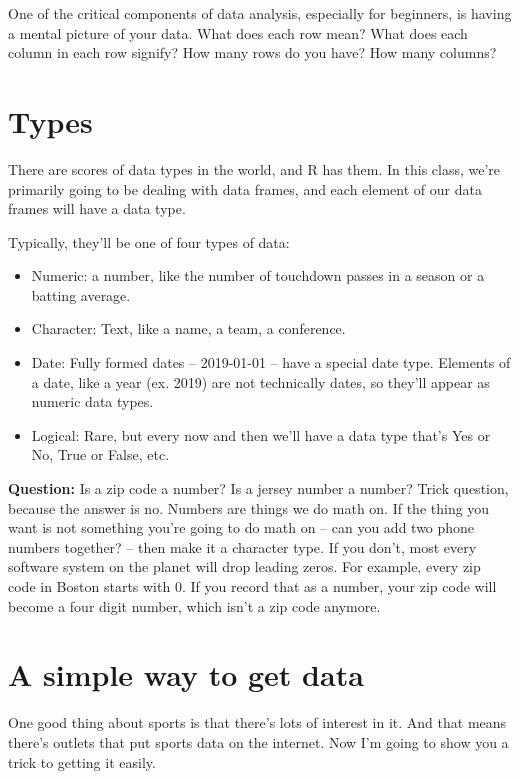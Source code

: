\documentclass[
]{book}
\providecommand{\tightlist}{%
  \setlength{\itemsep}{0pt}\setlength{\parskip}{0pt}}
\begin{document}
One of the critical components of data analysis, especially for beginners, is having a mental picture of your data. What does each row mean? What does each column in each row signify? How many rows do you have? How many columns?

\hypertarget{types}{%
\section{Types}\label{types}}

There are scores of data types in the world, and R has them. In this class, we're primarily going to be dealing with data frames, and each element of our data frames will have a data type.

Typically, they'll be one of four types of data:

\begin{itemize}
\tightlist
\item
  Numeric: a number, like the number of touchdown passes in a season or a batting average.
\item
  Character: Text, like a name, a team, a conference.
\item
  Date: Fully formed dates -- 2019-01-01 -- have a special date type. Elements of a date, like a year (ex. 2019) are not technically dates, so they'll appear as numeric data types.
\item
  Logical: Rare, but every now and then we'll have a data type that's Yes or No, True or False, etc.
\end{itemize}

\textbf{Question:} Is a zip code a number? Is a jersey number a number? Trick question, because the answer is no. Numbers are things we do math on. If the thing you want is not something you're going to do math on -- can you add two phone numbers together? -- then make it a character type. If you don't, most every software system on the planet will drop leading zeros. For example, every zip code in Boston starts with 0. If you record that as a number, your zip code will become a four digit number, which isn't a zip code anymore.

\hypertarget{a-simple-way-to-get-data}{%
\section{A simple way to get data}\label{a-simple-way-to-get-data}}

One good thing about sports is that there's lots of interest in it. And that means there's outlets that put sports data on the internet. Now I'm going to show you a trick to getting it easily.
\end{document}
